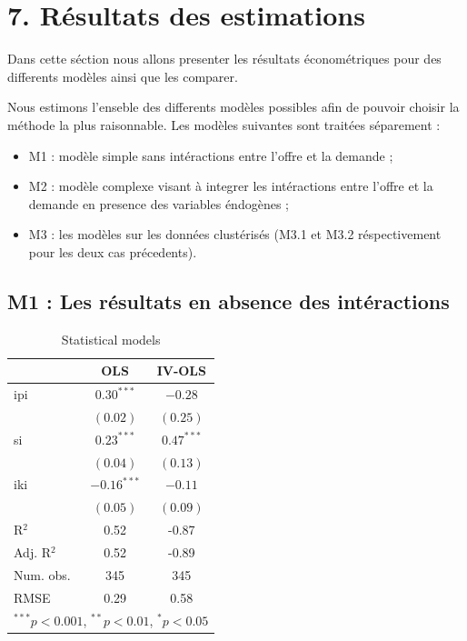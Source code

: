 \documentclass[11pt,]{article}
\providecommand{\tightlist}{%
  \setlength{\itemsep}{0pt}\setlength{\parskip}{0pt}}
\begin{document}
\hypertarget{resultats-des-estimations}{%
\section{7. Résultats des estimations}\label{resultats-des-estimations}}

Dans cette séction nous allons presenter les résultats économétriques
pour des differents modèles ainsi que les comparer.

Nous estimons l'enseble des differents modèles possibles afin de pouvoir
choisir la méthode la plus raisonnable. Les modèles suivantes sont
traitées séparement :

\begin{itemize}
\tightlist
\item
  M1 : modèle simple sans intéractions entre l'offre et la demande ;
\item
  M2 : modèle complexe visant à integrer les intéractions entre l'offre
  et la demande en presence des variables éndogènes ;
\item
  M3 : les modèles sur les données clustérisés (M3.1 et M3.2
  réspectivement pour les deux cas précedents).
\end{itemize}

\hypertarget{m1-les-resultats-en-absence-des-interactions}{%
\subsection{M1 : Les résultats en absence des
intéractions}\label{m1-les-resultats-en-absence-des-interactions}}

\FloatBarrier

\begin{table}[!htbp]
\begin{center}
\begin{tabular}{l c c }
\hline
 & OLS & IV-OLS \\
\hline
ipi        & $0.30^{***}$  & $-0.28$      \\
           & $(0.02)$      & $(0.25)$     \\
si         & $0.23^{***}$  & $0.47^{***}$ \\
           & $(0.04)$      & $(0.13)$     \\
iki        & $-0.16^{***}$ & $-0.11$      \\
           & $(0.05)$      & $(0.09)$     \\
\hline
R$^2$      & 0.52          & -0.87        \\
Adj. R$^2$ & 0.52          & -0.89        \\
Num. obs.  & 345           & 345          \\
RMSE       & 0.29          & 0.58         \\
\hline
\multicolumn{3}{l}{\scriptsize{$^{***}p<0.001$, $^{**}p<0.01$, $^*p<0.05$}}
\end{tabular}
\caption{Statistical models}
\label{table : ols et ivols}
\end{center}
\end{table}
\end{document}
